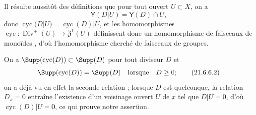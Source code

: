 
Il résulte aussitôt des définitions que pour tout ouvert $U\subset X$, on a
\[
  \boldsymbol{\mathsf{Y}}(D|U)=\boldsymbol{\mathsf{Y}}(D)\cap U,
\]
donc $\operatorname{cyc}(D|U)=\operatorname{cyc}(D)|U$, et les homomorphismes $\operatorname{cyc}:\operatorname{Div}^+(U)\to\mathfrak{Z}^1(U)$ définissent donc un homomorphisme de faisceaux de monoïdes , d'où l'homomorphisme cherché  de faisceaux de groupes.

On a $\Supp(\operatorname{cyc}(D))\subset\Supp(D)$ pour tout diviseur $D$ et
\begin{equation}
  \Supp(\operatorname{cyc}(D))=\Supp(D)\quad\text{lorsque}\quad D\geq0;
  \tag{21.6.6.2}\label{IV.21.6.6.2}
\end{equation}
on a déjà vu en effet la seconde relation ;
lorsque $D$ est quelconque, la relation $D_x=0$ entraîne l'existence d'un voisinage ouvert $U$ de $x$ tel que $D|U=0$, d'où $\operatorname{cyc}(D)|U=0$, ce qui prouve notre assertion.

